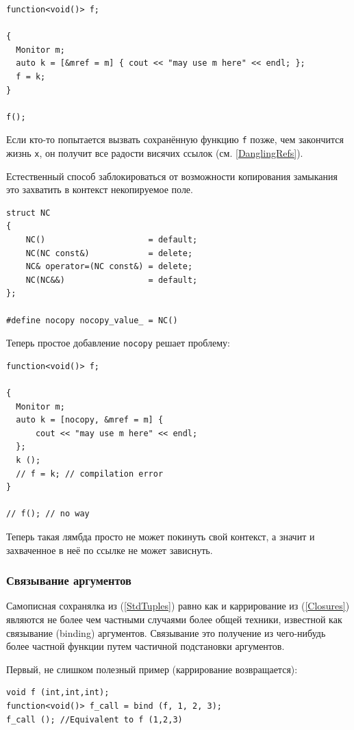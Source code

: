 \documentclass[a4paper,12pt,oneside]{article}
\begin{document}
\begin{lstlisting}
function<void()> f;

{
  Monitor m;
  auto k = [&mref = m] { cout << "may use m here" << endl; };
  f = k;
} 

f();
\end{lstlisting}

Если кто-то попытается вызвать сохранённую функцию \lstinline!f! позже, чем закончится жизнь \lstinline!x!, он получит все радости висячих ссылок (см. \ref{DanglingRefs}).

Естественный способ заблокироваться от возможности копирования замыкания это захватить в контекст некопируемое поле.

\begin{lstlisting}
struct NC
{
    NC()                     = default;
    NC(NC const&)            = delete;
    NC& operator=(NC const&) = delete;
    NC(NC&&)                 = default;
};

#define nocopy nocopy_value_ = NC()
\end{lstlisting}

Теперь простое добавление \lstinline!nocopy! решает проблему:

\begin{lstlisting}
function<void()> f;

{
  Monitor m;
  auto k = [nocopy, &mref = m] { 
      cout << "may use m here" << endl; 
  };
  k ();
  // f = k; // compilation error
}

// f(); // no way
\end{lstlisting}

Теперь такая лямбда просто не может покинуть свой контекст, а значит и захваченное в неё по ссылке не может зависнуть.

\subsubsection{Связывание аргументов}\label{Binding}

Самописная сохранялка из (\ref{StdTuples}) равно как и каррирование из (\ref{Closures}) являются не более чем частными случаями более общей техники, известной как связывание (binding) аргументов. Связывание это получение из чего-нибудь более частной функции путем частичной подстановки аргументов. 

Первый, не слишком полезный пример (каррирование возвращается):

\begin{lstlisting}
void f (int,int,int);
function<void()> f_call = bind (f, 1, 2, 3);
f_call (); //Equivalent to f (1,2,3)
\end{lstlisting}
\end{document}
